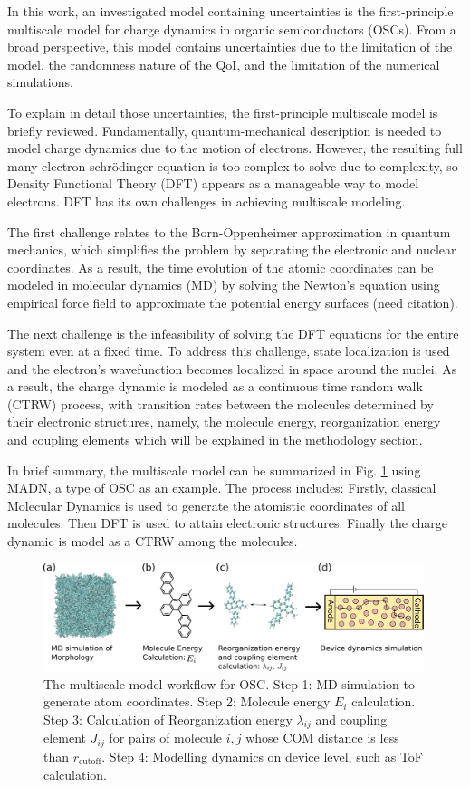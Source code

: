 \documentclass[letterpaper,12pt]{article}
\begin{document}
In this work, an investigated model containing uncertainties is the first-principle multiscale model for charge dynamics in organic semiconductors (OSCs).
From a broad perspective, this model contains uncertainties due to the limitation of the model, the randomness nature of the QoI, and the limitation of the numerical simulations.

To explain in detail those uncertainties, the first-principle multiscale model is briefly reviewed. 
Fundamentally, quantum-mechanical description is needed to model charge dynamics due to the motion of electrons. However, the resulting full many-electron schr\"{o}dinger equation is too complex to solve due to complexity, so Density Functional Theory (DFT) appears as a manageable way to model electrons.
DFT has its own challenges in achieving multiscale modeling.

The first challenge relates to the Born-Oppenheimer approximation in quantum
mechanics, which simplifies the problem by separating the electronic and nuclear
coordinates. As a result, the time evolution of the atomic coordinates can be modeled in molecular dynamics (MD) by solving the Newton's equation using empirical force field to approximate the potential energy surfaces (need citation). 

The next challenge is the infeasibility of solving the DFT equations for the entire system even at a fixed time. To address this challenge, state localization is used and the electron's wavefunction becomes localized in space around the nuclei. As a result, the charge dynamic is modeled as a continuous time random walk (CTRW) process, with transition rates between the molecules determined by their electronic structures, namely, the molecule energy, reorganization energy and coupling elements which will be explained in the methodology section. 

In brief summary, the multiscale model can be summarized in Fig. \ref{fig:MSM} using MADN, a type of OSC as an example.
The process includes: Firstly, classical Molecular Dynamics is used to generate the atomistic coordinates of all molecules. Then DFT is used to attain electronic structures. Finally the charge dynamic is model as a CTRW among the molecules.

\begin{figure}[h]
    \centering
    \includegraphics[width=0.99\textwidth]{figs/MSM.pdf}
    \caption{The multiscale model workflow for OSC. Step 1: MD simulation to generate atom coordinates. Step 2: Molecule energy $E_i$ calculation. Step 3: Calculation of Reorganization energy $\lambda_{ij}$ and coupling element $J_{ij}$ for pairs of molecule $i,j$ whose COM distance is less than $r_\text{cutoff}$. Step 4: Modelling dynamics on device level, such as ToF calculation.}
    \label{fig:MSM}
\end{figure}
\end{document}
